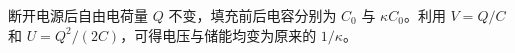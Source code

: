断开电源后自由电荷量 $Q$ 不变，填充前后电容分别为 $C_0$ 与 $\kappa C_0$。利用 $V=Q/C$ 和 $U=Q^2/(2C)$，可得电压与储能均变为原来的 $1/\kappa$。
